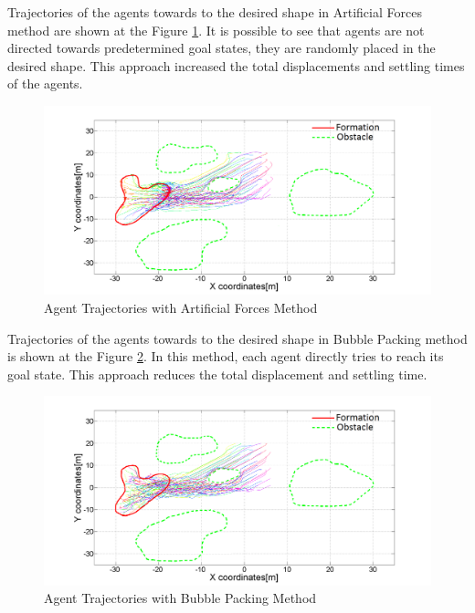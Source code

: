 \documentclass[letterpaper, 10 pt, conference]{ieeeconf}  %
\begin{document}
Trajectories of the agents towards to the desired shape in Artificial Forces method are shown at the Figure \ref{arto1}. It is possible to see that agents are not directed towards predetermined goal states, they are randomly placed in the desired shape. This approach increased the total displacements and settling times of the agents.		

\begin{figure}[thpb]
\caption{Agent Trajectories with Artificial Forces Method} \label{arto1}
\centerline{\includegraphics[scale = 0.17]{Aritificial_Trajecories_1}}
\end{figure} 	
 
 Trajectories of the agents towards to the desired shape in Bubble Packing method is shown at the Figure \ref{bubble1}. In this method, each agent directly tries to reach its goal state. This approach reduces the total displacement and settling time.

\begin{figure}[thpb]
\caption{Agent Trajectories with Bubble Packing Method}
\centerline{\includegraphics[scale = 0.17]{Bubble_Trajectories_1}} \label{bubble1}
\end{figure}
			
\end{document}

